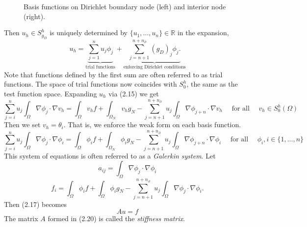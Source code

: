 \documentclass[12 pt]{report}
\newcommand{\RR}{\mathbb{R}}
\begin{document}
\begin{figure}[H]
\begin{subfigure}{0.50\textwidth}
      \label{fig:Reference Problem Contour}
    \end{subfigure}
    \caption{ Basis functions on Dirichlet boundary node (left) and interior node (right).}
\end{figure}

Then $u_h \in S^h_{g_D}$ is uniquely determined by $\{u_1, ..., u_n\} \in \RR$ in the expansion, 
\begin{equation}
  u_h = \underbrace{\sum_{j = 1}^{n} u_j \phi_j}_{\text{trial functions}} + \underbrace{\sum_{j = n + 1}^{n + n_\partial} (g_D)_j \phi_{j}.}_{\text{enforcing Dirichlet conditions}}
\end{equation}
Note that functions defined by the first sum are often referred to as trial functions. The space of trial functions now coincides with $S^h_{0}$, the same as the test function space. Expanding $u_h$ via (2.15) we get 
\begin{equation}
  \sum_{j = i}^n u_j \int_\Omega \nabla \phi_j \cdot \nabla v_h = \int_\Omega v_h f + \int_{\Omega_N} v_h g_N - \sum_{j = n + 1}^{n + n_\partial} u_j \int_\Omega \nabla \phi_{j + n} \cdot \nabla v_h \quad \text{ for all } \quad v_h \in {S}_{0}^h(\Omega)
\end{equation}
Then we set $v_h = \theta_i$. That is, we enforce the weak form on each basis function. 
\begin{equation}
  \sum_{j = i}^n u_j \int_\Omega \nabla \phi_j \cdot \nabla \phi_i = \int_\Omega \phi_i f + \int_{\Omega_N} \phi_i g_N - \sum_{j = n + 1}^{n + n_\partial} u_j \int_\Omega \nabla \phi_{j + n} \cdot \nabla \phi_i \quad \text{ for all }\quad \phi_i, i \in \{1, ..., n\}
\end{equation}
This system of equations is often referred to as a \textit{Galerkin system}. Let  
\begin{equation}
  a_{ij} = \int_\Omega \nabla \phi_j \cdot \nabla \phi_i
\end{equation}
\begin{equation}
  f_i = \int_\Omega \phi_i f + \int_\Omega \phi_i g_N - \sum_{j = n + 1}^{n + n_\partial} u_j \int_\Omega \nabla \phi_{j} \cdot \nabla \phi_i. 
\end{equation}
Then (2.17) becomes 
\begin{equation}
  Au = f
\end{equation}
The matrix $A$ formed in (2.20) is called the \textit{stiffness matrix}.
\end{document}
